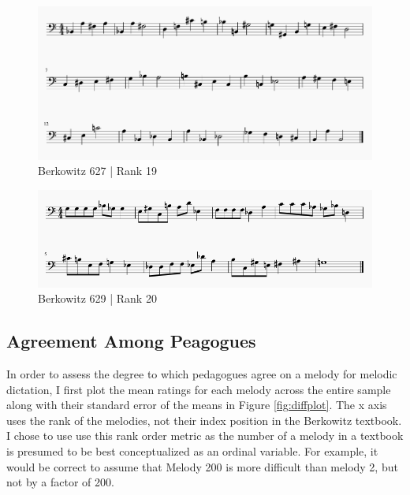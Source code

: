 \documentclass[]{book}
\begin{document}
\begin{figure}

{\centering \includegraphics[width=1\linewidth]{img/survey_melodies/Berkowitz627} 

}

\caption{Berkowitz 627 | Rank 19}\label{fig:berk627}
\end{figure}

\begin{figure}

{\centering \includegraphics[width=1\linewidth]{img/survey_melodies/Berkowitz629} 

}

\caption{Berkowitz 629 | Rank 20}\label{fig:berk629}
\end{figure}

\hypertarget{agreement-among-peagogues}{%
\subsection{Agreement Among Peagogues}\label{agreement-among-peagogues}}

In order to assess the degree to which pedagogues agree on a melody for melodic dictation, I first plot the mean ratings for each melody across the entire sample along with their standard error of the means in Figure \ref{fig:diffplot}.
The x axis uses the rank of the melodies, not their index position in the Berkowitz textbook.
I chose to use use this rank order metric as the number of a melody in a textbook is presumed to be best conceptualized as an ordinal variable.
For example, it would be correct to assume that Melody 200 is more difficult than melody 2, but not by a factor of 200.
\end{document}
